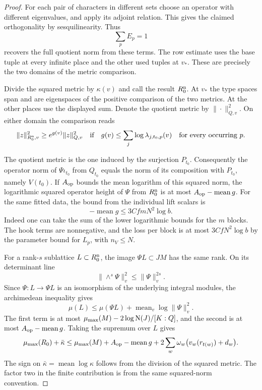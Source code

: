 \begin{proof}
For each
pair of characters in different sets choose an operator with
different eigenvalues, and apply its adjoint relation. This
gives the claimed orthogonality by sesquilinearity. Thus 
\[
  \sum_p E_p=1
\]
 recovers the full
quotient norm from these terms. The row estimate uses
the base tuple at every infinite place and the other used
tuples at \(v_*\). These are precisely the two domains of
the metric comparison. \label{cor:fitted-row-height-2}

Divide the squared metric by \(\kappa(v)\) and call the result
\(R_0^{\rm n}\). At \(v_*\) the type spaces span and are
eigenspaces of the positive comparison of the two metrics.
At the other places use the displayed sum. Denote the quotient metric by \(\|\cdot\|_{Q,v}^2\). On either
domain the comparison reads
\[
 \|z\|_{R_0^{\rm n},v}^2\ge e^{g(v)}\|z\|_{Q,v}^2
 \quad\text{if}\quad
 g(v)\le\sum_j\log\lambda_{j,t_0,p}(v)
       \quad\text{for every occurring }p .
\]

The quotient metric is the one induced by the surjection
\(P_{t_0}\). Consequently the operator norm of
\(\Psi\iota_{t_0}\) from \(Q_{t_0}\) equals the norm of its
composition with \(P_{t_0}\), namely \(V(t_0)\). If
\(A_{\rm op}\) bounds the mean logarithm of this squared norm,
the logarithmic squared operator height of \(\Psi\) from
\(R_0^{\rm n}\) is at most \(A_{\rm op}-\operatorname{mean}g\).
For the same fitted data, the bound from the individual
lift scalars is 
\[
  -\operatorname{mean}g\le
3CfmN^2\log b.
\]
 Indeed one can take the sum of the lower
logarithmic bounds for the \(m\) blocks. The hook terms are
nonnegative, and the loss per block is at most
\(3CfN^2\log b\) by the parameter bound for \(L_p\), with
\(n_V\le N\).

For a rank-\(s\) sublattice \(L\subset R_0^{\rm n}\),
the image \(\Psi L\subset JM\) has the same rank. On its
determinant line 
\[
  \|\wedge^s\Psi\|^2_v\le\|\Psi\|_v^{2s}.
\]
Since \(\Psi:L\to\Psi L\) is an isomorphism of the
underlying integral modules, the archimedean inequality gives
\[
 \mu(L)\le \mu(\Psi L)
                +\operatorname{mean}_v\log\|\Psi\|_v^2.
\]
The first term is at most \(\mu_{\max}(M)-2\log\mathrm N(J)/[K:Q]\),
and the second is at most \(A_{\rm op}-\operatorname{mean}g\).
Taking the supremum over \(L\) gives
\begin{equation}\label{eq:fitted-row-slope}
 \mu_{\max}(R_0)+\bar\kappa
 \le \mu_{\max}(M)+A_{\rm op}-\operatorname{mean}g+
   2\sum_w\omega_w\bigl(v_w(r_{t(w)})+d_w\bigr).
\end{equation}
The sign on \(\bar\kappa=\operatorname{mean}\log\kappa\)
follows from the division of the squared metric. The factor
two in the finite contribution is from the same squared-norm
convention.


\end{proof}
